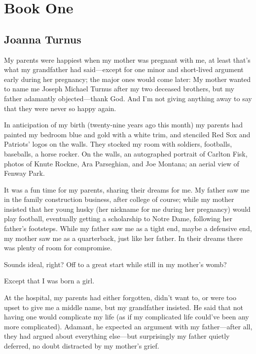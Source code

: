 \part{Book One}

\chapter{Joanna Turnus}

\titlemark

My parents were happiest when my mother was pregnant with me, at least
that's what my grandfather had said---except for one minor and
short-lived argument early during her pregnancy; the major ones would
come later: My mother wanted to name me Joseph Michael Turnus after my
two deceased brothers, but my father adamantly objected---thank God. And
I'm not giving anything away to say that they were never so happy again.

In anticipation of my birth (twenty-nine years ago this month) my
parents had painted my bedroom blue and gold with a white trim, and
stenciled Red Sox and Patriots' logos on the walls. They stocked my room
with soldiers, footballs, baseballs, a horse rocker. On the walls, an
autographed portrait of Carlton Fisk, photos of Knute Rockne, Ara
Parseghian, and Joe Montana; an aerial view of Fenway Park.

It was a fun time for my parents, sharing their dreams for me. My father
saw me in the family construction business, after college of course;
while my mother insisted that her young husky (her nickname for me
during her pregnancy) would play football, eventually getting a
scholarship to Notre Dame, following her father's footsteps. While my
father saw me as a tight end, maybe a defensive end, my mother saw me as
a quarterback, just like her father. In their dreams there was plenty of
room for compromise.

Sounds ideal, right? Off to a great start while still in my mother's
womb?

Except that I was born a girl.

At the hospital, my parents had either forgotten, didn't want to, or
were too upset to give me a middle name, but my grandfather insisted. He
said that not having one would complicate my life (as if my complicated
life could've been any more complicated). Adamant, he expected an
argument with my father---after all, they had argued about everything
else---but surprisingly my father quietly deferred, no doubt distracted
by my mother's grief.

